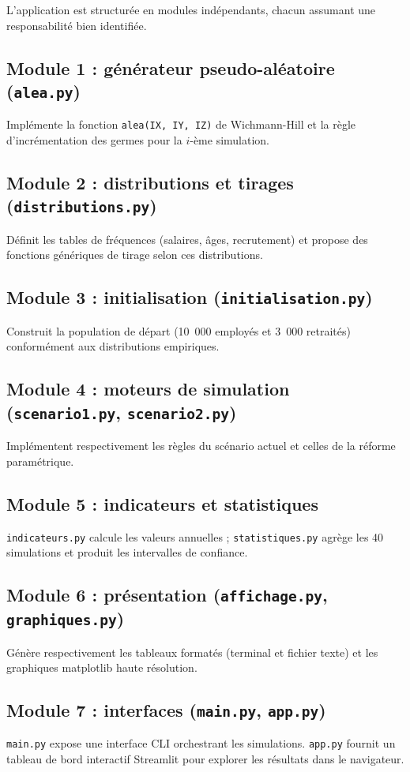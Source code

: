 \documentclass[12pt,a4paper,oneside]{report}
\newcommand{\code}[1]{\texttt{\color{primary}#1}}
\begin{document}
L'application est structurée en modules indépendants, chacun assumant une
responsabilité bien identifiée.

\subsection{Module 1 : générateur pseudo-aléatoire (\code{alea.py})}
Implémente la fonction \code{alea(IX, IY, IZ)} de Wichmann-Hill et la
règle d'incrémentation des germes pour la $i$-ème simulation.

\subsection{Module 2 : distributions et tirages (\code{distributions.py})}
Définit les tables de fréquences (salaires, âges, recrutement) et propose
des fonctions génériques de tirage selon ces distributions.

\subsection{Module 3 : initialisation (\code{initialisation.py})}
Construit la population de départ (10~000 employés et 3~000 retraités)
conformément aux distributions empiriques.

\subsection{Module 4 : moteurs de simulation
(\code{scenario1.py}, \code{scenario2.py})}
Implémentent respectivement les règles du scénario actuel et celles de
la réforme paramétrique.

\subsection{Module 5 : indicateurs et statistiques}
\code{indicateurs.py} calcule les valeurs annuelles ; \code{statistiques.py}
agrège les 40 simulations et produit les intervalles de confiance.

\subsection{Module 6 : présentation (\code{affichage.py}, \code{graphiques.py})}
Génère respectivement les tableaux formatés (terminal et fichier texte)
et les graphiques matplotlib haute résolution.

\subsection{Module 7 : interfaces (\code{main.py}, \code{app.py})}
\code{main.py} expose une interface CLI orchestrant les simulations.
\code{app.py} fournit un tableau de bord interactif Streamlit pour
explorer les résultats dans le navigateur.
\end{document}
